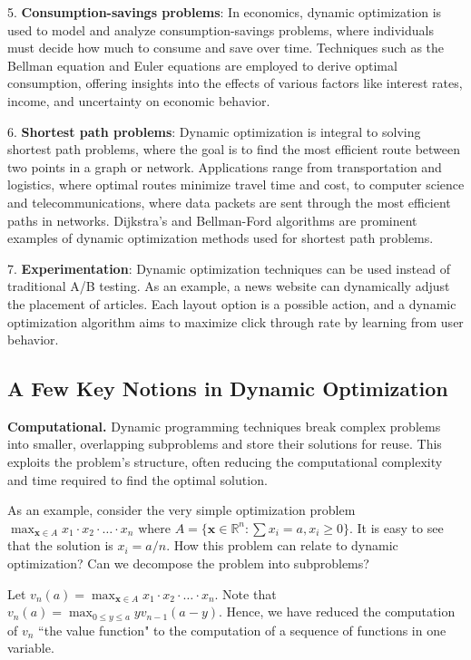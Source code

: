 \documentclass[letter,11pt]{article}
\begin{document}
5. \textbf{Consumption-savings problems}: In economics, dynamic optimization is used to model and analyze consumption-savings problems, where individuals must decide how much to consume and save over time. Techniques such as the Bellman equation and Euler equations are employed to derive optimal consumption, offering insights into the effects of various factors like interest rates, income, and uncertainty on economic behavior.

6. \textbf{Shortest path problems}: Dynamic optimization is integral to solving shortest path problems, where the goal is to find the most efficient route between two points in a graph or network. Applications range from transportation and logistics, where optimal routes minimize travel time and cost, to computer science and telecommunications, where data packets are sent through the most efficient paths in networks. Dijkstra's and Bellman-Ford algorithms are prominent examples of dynamic optimization methods used for shortest path problems.


7. \textbf{Experimentation}: Dynamic optimization techniques can be used instead of traditional A/B testing. 
As an example, a news website can dynamically adjust the placement of articles. Each layout option is a possible action, and a dynamic optimization algorithm aims to maximize click through rate by learning from user behavior.


\subsection{A Few Key Notions in Dynamic Optimization}


\textbf{Computational.} Dynamic programming techniques break complex problems into smaller, overlapping subproblems and store their solutions for reuse. This exploits the problem's structure, often reducing the computational complexity and time required to find the optimal solution.

As an example, consider the very simple optimization problem $\max _{ \boldsymbol{x} \in A  } x_{1} \cdot x_{2} \cdot \ldots \cdot x_{n}$
where $A = \{ \boldsymbol{x} \in \mathbb{R}^{n} : \sum x_{i} = a, x_{i} \geq 0 \}$. It is easy to see that the solution is $x_{i} = a/n$. How this problem can relate to dynamic optimization? Can we decompose the problem into subproblems? 

Let $v_{n}(a) = \max _{ \boldsymbol{x} \in A  } x_{1} \cdot x_{2} \cdot \ldots \cdot x_{n}$. Note that $v_{n}(a) = \max _{0 \leq y \leq a } yv_{n-1}(a-y) $. Hence, we have reduced the computation of $v_{n}$ ``the value function" to the computation of a sequence of functions in one variable. 
\end{document}
